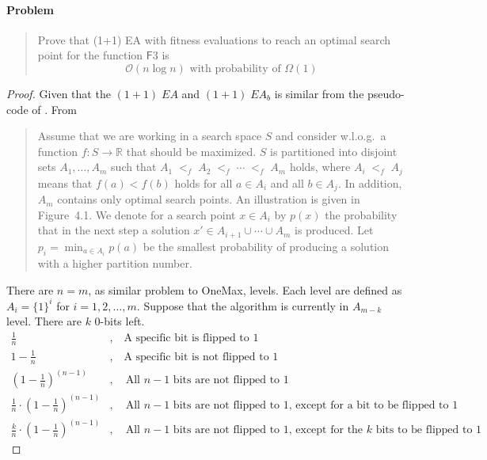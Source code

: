 \documentclass[a4paper, 12pt]{article}
\begin{document}
\paragraph{Problem}
    \begin{quote}
        Prove that (1+1) EA with fitness evaluations to reach an optimal search point for the function $\mathsf{F}$3 is 
        \[
            \mathcal{O}(n\log n)
            \text{ with probability of }
            \Omega(1)
        \]
    \end{quote}    
    \begin{proof}
        Given that the $(1+1)\;EA$ and $(1+1)\;EA_b$ is similar from the pseudo-code of \cite[p.42]{NeumannWitt2010}.
        From \cite[p.44]{NeumannWitt2010}
        \begin{quote}
            Assume that we are working in a search space $S$ and consider w.l.o.g.\ a function $f: S \to \mathbb{R}$ that should be maximized.
            $S$ is partitioned into disjoint sets $A_1,\ldots,A_m$ such that
            $A_1 \;{<_f}\; A_2 \;{<_f}\; \cdots \;{<_f}\; A_m$ holds, where $A_i \;{<_f}\; A_j$ means that $f(a) < f(b)$ holds for all
            $a \in A_i$ and all $b \in A_j$. In addition, $A_m$ contains only optimal search points. An illustration is given in Figure~4.1.
            We denote for a search point $x \in A_i$ by $p(x)$ the probability that in the next step a solution
            $x' \in A_{i+1} \cup \cdots \cup A_m$ is produced. Let $p_i = \min_{a \in A_i} p(a)$ be the smallest probability of producing a
            solution with a higher partition number. \cite[p.~44]{NeumannWitt2010}
        \end{quote}
        There are $n = m$, as similar problem to OneMax, levels. Each level are defined as $A_i=\{1\}^i$ for $i = 1,2,\ldots,m$. Suppose that the 
        algorithm is currently in $A_{m-k}$ level. There are $k$ 0-bits left.
        \begin{align*}
            \frac{1}{n}&,\quad\text{A specific bit is flipped to 1}\\
            1 - \frac{1}{n}&,\quad\text{A specific bit is not flipped to 1}\\
            \left(1 - \frac{1}{n}\right)^{(n-1)}&,\quad\text{All $n-1$ bits are not flipped to 1}\\
            \frac{1}{n}\cdot\left(1 - \frac{1}{n}\right)^{(n-1)}&,\quad\text{All $n-1$ bits are not flipped to 1, except for a bit to be flipped to 1}\\
            \frac{k}{n}\cdot\left(1 - \frac{1}{n}\right)^{(n-1)}&,\quad\text{All $n-1$ bits are not flipped to 1, except for the $k$ bits to be flipped to 1}

\end{align*}
\end{proof}
\end{document}
